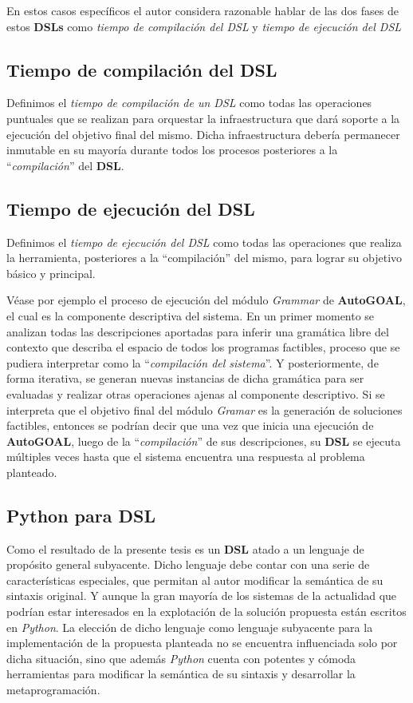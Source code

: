 En estos casos específicos el autor considera razonable hablar de las dos fases de
estos {\bf DSLs} como {\it tiempo de compilación del DSL} y
    {\it tiempo de ejecución del DSL}

\subsection{Tiempo de compilación del DSL}


Definimos el {\it tiempo de compilación de un DSL} como todas las operaciones puntuales que se
realizan para orquestar la infraestructura que dará soporte a la ejecución del objetivo
final del mismo. Dicha infraestructura debería permanecer inmutable en su mayoría
durante todos los procesos posteriores a la ``{\it compilación}'' del {\bf DSL}.

\subsection{Tiempo de ejecución del DSL}


Definimos el {\it tiempo de ejecución del DSL} como todas las operaciones que realiza
la herramienta, posteriores a la ``compilación'' del mismo, para lograr su objetivo básico y
principal.

Véase por ejemplo el proceso de ejecución del módulo {\it Grammar} de {\bf AutoGOAL}, el cual es
la componente descriptiva del sistema. En un primer momento se analizan todas las descripciones
aportadas para inferir una gramática libre del contexto que describa el espacio de todos los
programas factibles, proceso que se pudiera interpretar como la ``{\it compilación del sistema}''. Y
posteriormente, de forma iterativa, se generan nuevas instancias de dicha gramática para ser
evaluadas y realizar otras operaciones ajenas al componente descriptivo. Si se interpreta que
el objetivo final del módulo {\it Gramar} es la generación de soluciones factibles, entonces se
podrían decir que una vez que inicia una ejecución de {\bf AutoGOAL}, luego de la ``{\it compilación}''
de sus descripciones, su {\bf DSL} se ejecuta múltiples veces hasta que el sistema encuentra una
respuesta al problema planteado.

\subsection{Python para DSL}

Como el resultado de la presente tesis es un {\bf DSL} atado a un lenguaje de propósito general
subyacente. Dicho lenguaje debe contar con una serie de características especiales,
que permitan al autor modificar la semántica de su sintaxis original. Y aunque la gran mayoría
de los sistemas de la actualidad que podrían estar interesados en la explotación de la solución
propuesta están escritos en {\it Python}. La elección de dicho lenguaje como lenguaje subyacente
para la implementación de la propuesta planteada no se encuentra influenciada solo por dicha
situación, sino que además {\it Python} cuenta con potentes y cómoda herramientas para modificar
la semántica de su sintaxis y desarrollar la metaprogramación.

